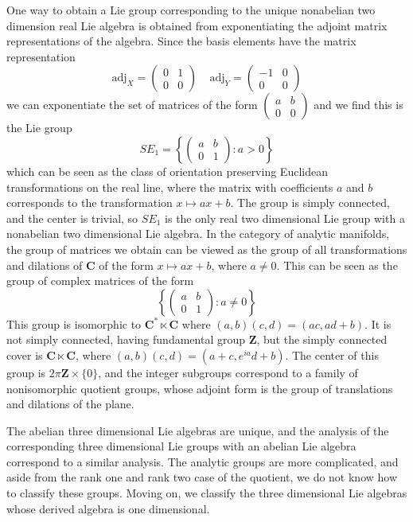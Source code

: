 One way to obtain a Lie group corresponding to the unique nonabelian two dimension real Lie algebra is obtained from exponentiating the adjoint matrix representations of the algebra. Since the basis elements have the matrix representation
%
\[ \text{adj}_X = \begin{pmatrix} 0 & 1 \\ 0 & 0 \end{pmatrix}\ \ \ \ \ \text{adj}_Y = \begin{pmatrix} -1 & 0 \\ 0 & 0 \end{pmatrix} \]
%
we can exponentiate the set of matrices of the form $\left( \begin{smallmatrix} a & b \\ 0 & 0 \end{smallmatrix} \right)$ and we find this is the Lie group
%
\[ SE_1 = \left\{ \begin{pmatrix} a & b \\ 0 & 1 \end{pmatrix} : a > 0 \right\} \]
%
which can be seen as the class of orientation preserving Euclidean transformations on the real line, where the matrix with coefficients $a$ and $b$ corresponds to the transformation $x \mapsto ax + b$. The group is simply connected, and the center is trivial, so $SE_1$ is the only real two dimensional Lie group with a nonabelian two dimensional Lie algebra. In the category of analytic manifolds, the group of matrices we obtain can be viewed as the group of all transformations and dilations of $\mathbf{C}$ of the form $x \mapsto ax + b$, where $a \neq 0$. This can be seen as the group of complex matrices of the form
%
\[ \left\{ \begin{pmatrix} a & b \\ 0 & 1 \end{pmatrix} : a \neq 0 \right\} \]
%
This group is isomorphic to $\mathbf{C}^* \ltimes \mathbf{C}$ where $(a,b)(c,d) = (ac, ad + b)$. It is not simply connected, having fundamental group $\mathbf{Z}$, but the simply connected cover is $\mathbf{C} \ltimes \mathbf{C}$, where $(a,b)(c,d) = (a + c, e^{ia}d + b)$. The center of this group is $2 \pi \mathbf{Z} \times \{ 0 \}$, and the integer subgroups correspond to a family of nonisomorphic quotient groups, whose adjoint form is the group of translations and dilations of the plane.

The abelian three dimensional Lie algebras are unique, and the analysis of the corresponding three dimensional Lie groups with an abelian Lie algebra correspond to a similar analysis. The analytic groups are more complicated, and aside from the rank one and rank two case of the quotient, we do not know how to classify these groups. Moving on, we classify the three dimensional Lie algebras whose derived algebra is one dimensional.

